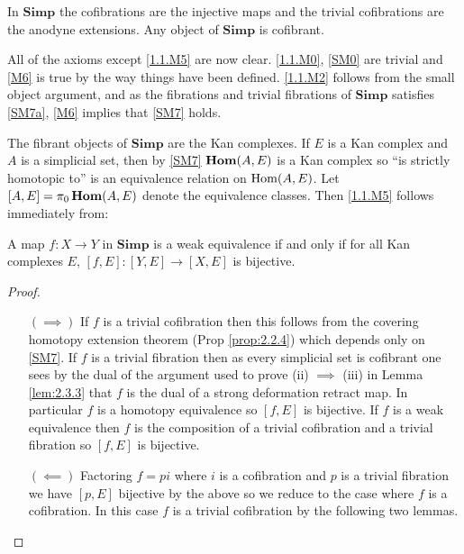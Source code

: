 \documentclass[../main]{subfiles}
\begin{document}
\begin{proposition}\label{prop:2.3.3}
In $\mathbf{Simp}$ the cofibrations are the injective maps and the trivial cofibrations are the anodyne extensions. Any object of $\mathbf{Simp}$ is cofibrant.
\end{proposition}

All of the axioms except \ref{1.1.M5} are now clear. \ref{1.1.M0}, \ref{SM0} are trivial and \ref{M6} is true by the way things have been defined. \ref{1.1.M2} follows from the small object argument, and as the fibrations and trivial fibrations of $\mathbf{Simp}$ satisfies \ref{SM7a}, \ref{M6} implies that \ref{SM7} holds.

The fibrant objects of $\mathbf{Simp}$ are the Kan complexes. If $E$ is a Kan complex and $A$ is a simplicial set, then by \ref{SM7} $\operatorname{\mathbf{Hom}} (A, E)$ is a Kan complex so ``is strictly homotopic to'' is an equivalence relation on $\operatorname{Hom} (A, E)$. Let \\$[A, E] = \pi_0 \operatorname{\mathbf{Hom}} (A, E)$ denote the equivalence classes. Then \ref{1.1.M5} follows immediately from:

\begin{proposition}\label{prop:2.3.4}
    A map $f \colon X \longrightarrow Y$ in $\mathbf{Simp}$ is a weak equivalence if and only if for all Kan complexes $E$, $[f, E] \colon [Y, E] \longrightarrow [X, E]$ is bijective.
\end{proposition}

\begin{proof}\phantom{,}\begin{enumerate}
    \item[$(\implies)$] If $f$ is a trivial cofibration then this follows from the covering homotopy extension theorem (Prop \ref{prop:2.2.4}) which depends only on \ref{SM7}. If $f$ is a trivial fibration then as every simplicial set is cofibrant one sees by the dual of the argument used to prove (ii) $\implies$ (iii) in Lemma \ref{lem:2.3.3} that $f$ is the dual of a strong deformation retract map. In particular $f$ is a homotopy equivalence so $[f, E]$ is bijective. If $f$ is a weak equivalence then $f$ is the composition of a trivial cofibration and a trivial fibration so $[f, E]$ is bijective.
    
    \item[$(\impliedby)$]Factoring $f = pi$ where $i$ is a cofibration and $p$ is a trivial fibration we have $[p, E]$ bijective by the above so we reduce to the case where $f$ is a cofibration. In this case $f$ is a trivial cofibration by the following two lemmas.
\end{enumerate}
\end{proof}
\end{document}

